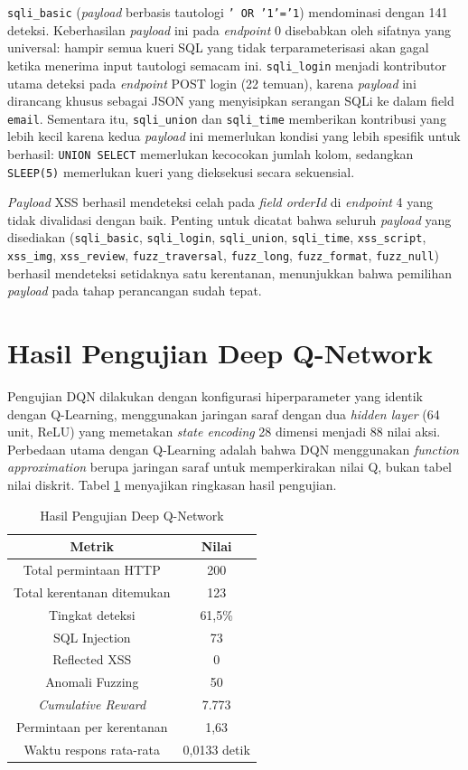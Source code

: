 \texttt{sqli\_basic} (\textit{payload} berbasis tautologi \texttt{' OR '1'='1}) mendominasi dengan 141 deteksi. Keberhasilan \textit{payload} ini pada \textit{endpoint} 0 disebabkan oleh sifatnya yang universal: hampir semua kueri SQL yang tidak terparameterisasi akan gagal ketika menerima input tautologi semacam ini. \texttt{sqli\_login} menjadi kontributor utama deteksi pada \textit{endpoint} POST login (22 temuan), karena \textit{payload} ini dirancang khusus sebagai JSON yang menyisipkan serangan SQLi ke dalam field \texttt{email}. Sementara itu, \texttt{sqli\_union} dan \texttt{sqli\_time} memberikan kontribusi yang lebih kecil karena kedua \textit{payload} ini memerlukan kondisi yang lebih spesifik untuk berhasil: \texttt{UNION SELECT} memerlukan kecocokan jumlah kolom, sedangkan \texttt{SLEEP(5)} memerlukan kueri yang dieksekusi secara sekuensial.

\textit{Payload} XSS berhasil mendeteksi celah pada \textit{field orderId} di \textit{endpoint} 4 yang tidak divalidasi dengan baik. Penting untuk dicatat bahwa seluruh \textit{payload} yang disediakan (\texttt{sqli\_basic}, \texttt{sqli\_login}, \texttt{sqli\_union}, \texttt{sqli\_time}, \texttt{xss\_script}, \texttt{xss\_img}, \texttt{xss\_review}, \texttt{fuzz\_traversal}, \texttt{fuzz\_long}, \texttt{fuzz\_format}, \texttt{fuzz\_null}) berhasil mendeteksi setidaknya satu kerentanan, menunjukkan bahwa pemilihan \textit{payload} pada tahap perancangan sudah tepat.

\section{Hasil Pengujian Deep Q-Network}

Pengujian DQN dilakukan dengan konfigurasi hiperparameter yang identik dengan Q-Learning, menggunakan jaringan saraf dengan dua \textit{hidden layer} (64 unit, ReLU) yang memetakan \textit{state encoding} 28 dimensi menjadi 88 nilai aksi. Perbedaan utama dengan Q-Learning adalah bahwa DQN menggunakan \textit{function approximation} berupa jaringan saraf untuk memperkirakan nilai Q, bukan tabel nilai diskrit. Tabel \ref{tab:dqn_results} menyajikan ringkasan hasil pengujian.

\begin{table}[H]
\centering
\caption{Hasil Pengujian Deep Q-Network}
\label{tab:dqn_results}
\begin{tabular}{|c|c|}
\hline
\textbf{Metrik} & \textbf{Nilai} \\
\hline
Total permintaan HTTP & 200 \\
Total kerentanan ditemukan & 123 \\
Tingkat deteksi & 61,5\% \\
SQL Injection & 73 \\
Reflected XSS & 0 \\
Anomali Fuzzing & 50 \\
\textit{Cumulative Reward} & 7.773 \\
Permintaan per kerentanan & 1,63 \\
Waktu respons rata-rata & 0,0133 detik \\
\hline
\end{tabular}
\end{table}

